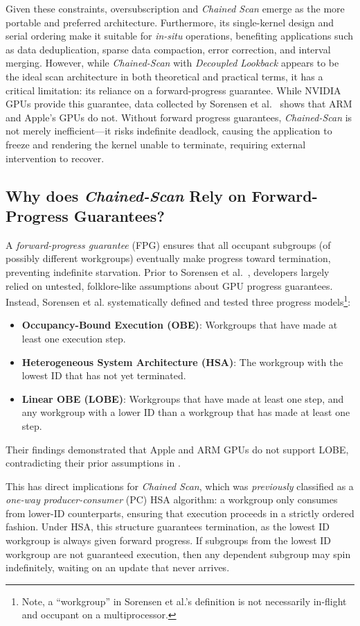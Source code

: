 \documentclass[sigconf]{acmart}
\begin{document}
Given these constraints, oversubscription and \emph{Chained Scan} emerge as the more portable and preferred architecture. Furthermore, its single-kernel design and serial ordering make it suitable for \emph{in-situ} operations, benefiting applications such as data deduplication, sparse data compaction, error correction, and interval merging. However, while \emph{Chained-Scan} with \emph{Decoupled Lookback} appears to be the ideal scan architecture in both theoretical and practical terms, it has a critical limitation: its reliance on a forward-progress guarantee. While NVIDIA GPUs provide this guarantee, data collected by Sorensen et al.~\cite{sorensen2021} shows that ARM and Apple’s GPUs do not. Without forward progress guarantees, \emph{Chained-Scan} is not merely inefficient---it risks indefinite deadlock, causing the application to freeze and rendering the kernel unable to terminate, requiring external intervention to recover.

\subsection{Why does \emph{Chained-Scan} Rely on Forward-Progress Guarantees?}
A \emph{forward-progress guarantee} (FPG) ensures that all occupant subgroups (of possibly different workgroups) eventually make progress toward termination, preventing indefinite starvation. Prior to Sorensen et al.~\cite{sorensen2018,sorensen2021}, developers largely relied on untested, folklore-like assumptions about GPU progress guarantees. Instead, Sorensen et al. systematically defined and tested three progress models\footnote{Note, a ``workgroup'' in Sorensen et al.'s definition is not necessarily in-flight and occupant on a multiprocessor.}:
\begin{itemize}
  \item \textbf{Occupancy-Bound Execution (OBE)}: Workgroups that have made at least one execution step.
  \item \textbf{Heterogeneous System Architecture (HSA)}: The workgroup with the lowest ID that has not yet terminated.
  \item \textbf{Linear OBE (LOBE)}: Workgroups that have made at least one step, and any workgroup with a lower ID than a workgroup that has made at least one step.
\end{itemize}
Their findings demonstrated that Apple and ARM GPUs do not support LOBE, contradicting their prior assumptions in \cite{sorensen2018}. 

This has direct implications for \emph{Chained Scan}, which was \emph{previously} classified as a \emph{one-way producer-consumer} (PC) HSA algorithm: a workgroup only consumes from lower-ID counterparts, ensuring that execution proceeds in a strictly ordered fashion. Under HSA, this structure guarantees termination, as the lowest ID workgroup is always given forward progress. If subgroups from the lowest ID workgroup are not guaranteed execution, then any dependent subgroup may spin indefinitely, waiting on an update that never arrives.   
\end{document}
